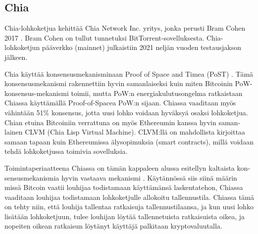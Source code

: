 \subsection{Chia\label{chia}}
\begin{otherlanguage}{english}\sloppy

Chia-lohkoketjua kehittää Chia Network Inc. yritys, jonka perusti Bram Cohen 2017 \cite{chia1}. Bram Cohen on tullut tunnetuksi
BitTorrent-sovelluksesta. Chia-lohkoketjun pääverkko (mainnet) julkaistiin 2021 neljän vuoden testausjakson jälkeen.

Chia käyttää konsensusmekanisminaan Proof of Space and Timea (PoST) \cite{chia1}. Tämä konsensusmekanismi rakennettiin hyvin samanlaiseksi kuin miten Bitcoinin PoW-konsensus-mekanismi toimii, mutta PoW:n energiakulutusongelma ratkaistaan Chiassa käyttämällä Proof-of-Spacea PoW:n sijaan. Chiassa vaaditaan myös vähintään 51\% konsensus, jotta uusi lohko voidaan hyväksyä osaksi lohkoketjua. Chian etuina Bitcoiniin verrattuna on myös Ethereumin kanssa hyvin samanlainen CLVM (Chia Lisp Virtual Machine). CLVM:llä on mahdollista kirjoittaa samaan tapaan kuin Ethereumissa älysopimuksia (smart contracts), millä voidaan tehdä lohkoketjussa toimivia sovelluksia.

Toimintaperiaatteena Chiassa on tämän kappaleen alussa esitellyn kaltaista konsensusmekanismia hyvin vastaava mekanismi \cite{pospchia1}. Käytännössä siis siinä määrin missä Bitcoin vaatii louhijaa todistamaan käyttämänsä laskentatehon, Chiassa vaaditaan louhijaa todistamaan lohkoketjulle allokoitu tallennustila. Chiassa tämä on tehty niin, että louhija tallentaa ratkaisuja tallennustilaansa, ja kun uusi lohko lisätään lohkoketjuun, tulee louhijan löytää tallennetuista ratkaisuista oikea, ja nopeiten oikean ratkaisun löytänyt käyttäjä palkitaan kryptovaluutalla.


\end{otherlanguage}
